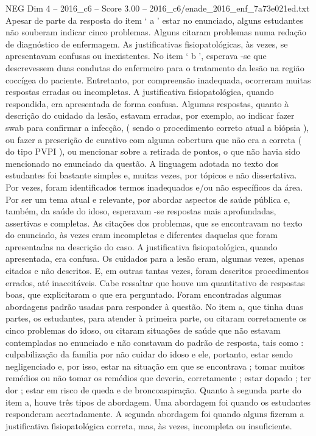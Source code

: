 \begin{textsample}{NEG Dim 4 – 2016\_c6 – Score 3.00 – 2016\_c6/enade\_2016\_enf\_7a73e021ed.txt}
Apesar de parte da resposta do item ‘ a ’ estar no enunciado, alguns estudantes não souberam indicar cinco problemas.
Alguns citaram problemas numa redação de diagnóstico de enfermagem.
As justificativas fisiopatológicas, às vezes, se apresentavam confusas ou inexistentes.
No item ‘ b ’, esperava -se que descrevessem duas condutas do enfermeiro para o tratamento da lesão na região coccígea do paciente.
Entretanto, por compreensão inadequada, ocorreram muitas respostas erradas ou incompletas.
A justificativa fisiopatológica, quando respondida, era apresentada de forma confusa.
Algumas respostas, quanto à descrição do cuidado da lesão, estavam erradas, por exemplo, ao indicar fazer swab para confirmar a infecção, ( sendo o procedimento correto atual a biópsia ), ou fazer a prescrição de curativo com alguma cobertura que não era a correta ( do tipo PVPI ), ou mencionar sobre a retirada de pontos, o que não havia sido mencionado no enunciado da questão.
A linguagem adotada no texto dos estudantes foi bastante simples e, muitas vezes, por tópicos e não dissertativa.
Por vezes, foram identificados termos inadequados e/ou não específicos da área.
Por ser um tema atual e relevante, por abordar aspectos de saúde pública e, também, da saúde do idoso, esperavam -se respostas mais aprofundadas, assertivas e completas.
As citações dos problemas, que se encontravam no texto do enunciado, às vezes eram incompletas e diferentes daquelas que foram apresentadas na descrição do caso.
A justificativa fisiopatológica, quando apresentada, era confusa.
Os cuidados para a lesão eram, algumas vezes, apenas citados e não descritos.
E, em outras tantas vezes, foram descritos procedimentos errados, até inaceitáveis.
Cabe ressaltar que houve um quantitativo de respostas boas, que explicitaram o que era perguntado.
Foram encontradas algumas abordagens padrão usadas para responder à questão.
No item a, que tinha duas partes, os estudantes, para atender à primeira parte, ou citaram corretamente os cinco problemas do idoso, ou citaram situações de saúde que não estavam contempladas no enunciado e não constavam do padrão de resposta, tais como : culpabilização da família por não cuidar do idoso e ele, portanto, estar sendo negligenciado e, por isso, estar na situação em que se encontrava ; tomar muitos remédios ou não tomar os remédios que deveria, corretamente ; estar dopado ; ter dor ; estar em risco de queda e de broncoaspiração.
Quanto à segunda parte do item a, houve três tipos de abordagem.
Uma abordagem foi quando os estudantes responderam acertadamente.
A segunda abordagem foi quando alguns fizeram a justificativa fisiopatológica correta, mas, às vezes, incompleta ou insuficiente.

\end{textsample}
